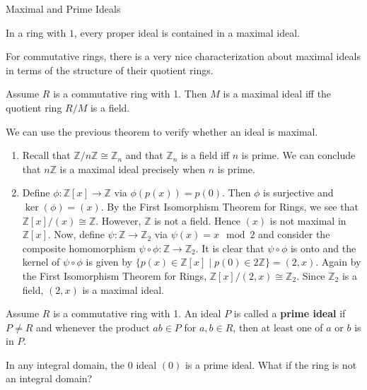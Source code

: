\begin{section}{Maximal and Prime Ideals}
\begin{theorem}
In a ring with $1$, every proper ideal is contained in a maximal ideal.
\end{theorem}

For commutative rings, there is a very nice characterization about maximal ideals in terms of the structure of their quotient rings.

\begin{theorem}
Assume $R$ is a commutative ring with 1.  Then $M$ is a maximal ideal iff the quotient ring $R/M$ is a field.
\end{theorem}

\begin{example}
We can use the previous theorem to verify whether an ideal is maximal.
\begin{enumerate}[label=\rm{(\arabic*)}]
\item Recall that $\mathbb{Z}/n\mathbb{Z}\cong \mathbb{Z}_n$ and that $\mathbb{Z}_n$ is a field iff $n$ is prime.  We can conclude that $n\mathbb{Z}$ is a maximal ideal precisely when $n$ is prime.
\item Define $\phi:\mathbb{Z}[x]\to\mathbb{Z}$ via $\phi(p(x))=p(0)$.  Then $\phi$ is surjective and $\ker(\phi)=(x)$.  By the First Isomorphism Theorem for Rings, we see that $\mathbb{Z}[x]/(x)\cong \mathbb{Z}$.  However, $\mathbb{Z}$ is not a field.  Hence $(x)$ is not maximal in $\mathbb{Z}[x]$.  Now, define $\psi:\mathbb{Z}\to\mathbb{Z}_2$ via $\psi(x)=x\mod 2$ and consider the composite homomorphism $\psi\circ\phi:\mathbb{Z}\to\mathbb{Z}_2$.    It is clear that $\psi\circ\phi$ is onto and the kernel of $\psi\circ\phi$ is given by $\{p(x)\in\mathbb{Z}[x]\mid p(0)\in 2\mathbb{Z}\}=(2,x)$. Again by the First Isomorphism Theorem for Rings, $\mathbb{Z}[x]/(2,x)\cong \mathbb{Z}_2$.  Since $\mathbb{Z}_2$ is a field, $(2,x)$ is a maximal ideal.
\end{enumerate}
\end{example}

\begin{definition}
Assume $R$ is a commutative ring with 1.  An ideal $P$ is called a \textbf{prime ideal} if $P\neq R$ and whenever the product $ab\in P$ for $a,b\in R$, then at least one of $a$ or $b$ is in $P$.
\end{definition}

\begin{example}
In any integral domain, the 0 ideal $(0)$ is a prime ideal. What if the ring is not an integral domain?
\end{example}


\end{section}
